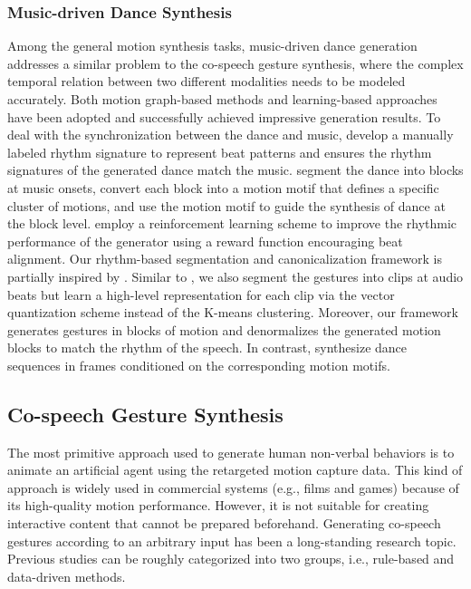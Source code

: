\subsubsection{Music-driven Dance Synthesis}
Among the general motion synthesis tasks, music-driven dance generation addresses a similar problem to the co-speech gesture synthesis, where the complex temporal relation between two different modalities needs to be modeled accurately. Both motion graph-based methods \cite{kim2006making,chen2021choreomaster} and learning-based approaches \cite{Li_2021_aist,valle2021transflower,li2022bailando} have been adopted and successfully achieved impressive generation results. To deal with the synchronization between the dance and music, \citet{chen2021choreomaster} develop a manually labeled rhythm signature to represent beat patterns and ensures the rhythm signatures of the generated dance match the music. \citet{aristidou2021rhythm} segment the dance into blocks at music onsets, convert each block into a motion motif \cite{aristidou2018deep} that defines a specific cluster of motions, and use the motion motif to guide the synthesis of dance at the block level. \citet{li2022bailando} employ a reinforcement learning scheme to improve the rhythmic performance of the generator using a reward function encouraging beat alignment. Our rhythm-based segmentation and canonicalization framework is partially inspired by \cite{aristidou2021rhythm}. Similar to \cite{aristidou2021rhythm}, we also segment the gestures into clips at audio beats but learn a high-level representation for each clip via the vector quantization scheme \cite{oord2017neural} instead of the K-means clustering. Moreover, our framework generates gestures in blocks of motion and denormalizes the generated motion blocks to match the rhythm of the speech. In contrast, \citet{aristidou2021rhythm} synthesize dance sequences in frames conditioned on the corresponding motion motifs.

\subsection{Co-speech Gesture Synthesis}
The most primitive approach used to generate human non-verbal behaviors is to animate an artificial agent using the retargeted motion capture data. This kind of approach is widely used in commercial systems (e.g., films and games) because of its high-quality motion performance. However, it is not suitable for creating interactive content that cannot be prepared beforehand. Generating co-speech gestures according to an arbitrary input has been a long-standing research topic. Previous studies can be roughly categorized into two groups, i.e., rule-based and data-driven methods.

